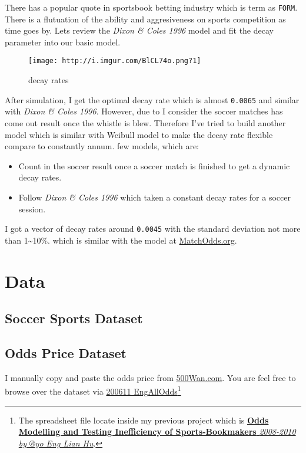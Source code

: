 \documentclass[article]{jss}
\providecommand{\tightlist}{%
  \setlength{\itemsep}{0pt}\setlength{\parskip}{0pt}}
\begin{document}
There has a popular quote in sportsbook betting industry which is term
as \texttt{FORM}. There is a flutuation of the ability and aggresiveness
on sports competition as time goes by. Lets review the \emph{Dixon \&
Coles 1996} model and fit the decay parameter into our basic model.
\bigbreak

\begin{figure}[htbp]
\centering
\texttt{[image: http://i.imgur.com/BlCL74o.png?1]}
\caption{decay rates}
\end{figure}

After simulation, I get the optimal decay rate which is almost
\texttt{0.0065} and similar with \emph{Dixon \& Coles 1996}. However,
due to I consider the soccer matches has come out result once the
whistle is blew. Therefore I've tried to build another model which is
similar with Weibull model to make the decay rate flexible compare to
constantly annum. few models, which are:

\begin{itemize}
\tightlist
\item
  Count in the soccer result once a soccer match is finished to get a
  dynamic decay rates.
\item
  Follow \emph{Dixon \& Coles 1996} which taken a constant decay rates
  for a soccer session.
\end{itemize}

I got a vector of decay rates around \texttt{0.0045} with the standard
deviation not more than 1\textasciitilde{}10\%. which is similar with
the model at \href{http://matchodds.org}{MatchOdds.org}.

\section{Data}\label{data}

\subsection{Soccer Sports Dataset}\label{soccer-sports-dataset}

\subsection{Odds Price Dataset}\label{odds-price-dataset}

I manually copy and paste the odds price from \href{}{500Wan.com}. You
are feel free to browse over the dataset via
\href{200611\%20EngAllOdds}{200611 EngAllOdds}\footnote{The spreadsheet
  file locate inside my previous project which is
  \href{https://www.dropbox.com/home/Research\%20Project\%202}{\textbf{Odds
  Modelling and Testing Inefficiency of Sports-Bookmakers}
  \emph{2008-2010 by ®yo Eng Lian Hu}}.}
\end{document}
